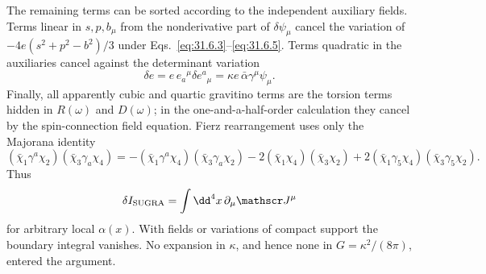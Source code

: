 \begin{enumerate}
  The remaining terms can be sorted according to the independent
  auxiliary fields.  Terms linear in \(s,p,b_\mu\) from the
  nonderivative part of \(\delta\psi_\mu\) cancel the variation of
  \(-4e(s^2+p^2-b^2)/3\) under
  Eqs.~\eqref{eq:31.6.3}--\eqref{eq:31.6.5}.  Terms quadratic in the
  auxiliaries cancel against the determinant variation
  \[
    \delta e=e\,e_a{}^\mu\delta e^a{}_\mu
            =\kappa e\,\bar\alpha\gamma^\mu\psi_\mu .
  \]
  Finally, all apparently cubic and quartic gravitino terms are the
  torsion terms hidden in \(R(\omega)\) and \(D(\omega)\); in the
  one-and-a-half-order calculation they cancel by the spin-connection
  field equation.  Fierz rearrangement uses only the Majorana identity
  \[
    (\bar\chi_1\gamma^a\chi_2)(\bar\chi_3\gamma_a\chi_4)
      =-(\bar\chi_1\gamma^a\chi_4)
        (\bar\chi_3\gamma_a\chi_2)
       -2(\bar\chi_1\chi_4)(\bar\chi_3\chi_2)
       +2(\bar\chi_1\gamma_5\chi_4)
        (\bar\chi_3\gamma_5\chi_2).
  \]
  Thus
  \[
    \delta I_{\rm SUGRA}=\int \dd^4x\,\partial_\mu\mathscr J^\mu
  \]
  for arbitrary local \(\alpha(x)\).  With fields or variations of
  compact support the boundary integral vanishes.  No expansion in
  \(\kappa\), and hence none in \(G=\kappa^2/(8\pi)\), entered the
  argument.


\end{enumerate}
